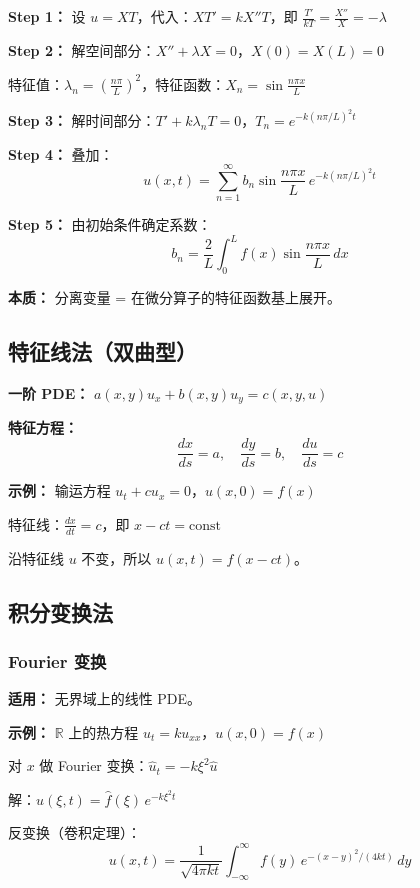 \textbf{Step 1：} 设 $u = XT$，代入：$XT' = kX''T$，即 $\frac{T'}{kT} = \frac{X''}{X} = -\lambda$

\textbf{Step 2：} 解空间部分：$X'' + \lambda X = 0$，$X(0) = X(L) = 0$

特征值：$\lambda_n = \left(\frac{n\pi}{L}\right)^2$，特征函数：$X_n = \sin\frac{n\pi x}{L}$

\textbf{Step 3：} 解时间部分：$T' + k\lambda_n T = 0$，$T_n = e^{-k(n\pi/L)^2 t}$

\textbf{Step 4：} 叠加：
\[
u(x,t) = \sum_{n=1}^{\infty} b_n \sin\frac{n\pi x}{L}\, e^{-k(n\pi/L)^2 t}
\]

\textbf{Step 5：} 由初始条件确定系数：
\[
b_n = \frac{2}{L}\int_0^L f(x)\sin\frac{n\pi x}{L}\,dx
\]

\textbf{本质：} 分离变量 = 在微分算子的特征函数基上展开。

\subsection{特征线法（双曲型）}

\textbf{一阶 PDE：} $a(x,y)u_x + b(x,y)u_y = c(x,y,u)$

\textbf{特征方程：}
\[
\frac{dx}{ds} = a, \quad \frac{dy}{ds} = b, \quad \frac{du}{ds} = c
\]

\textbf{示例：} 输运方程 $u_t + cu_x = 0$，$u(x,0) = f(x)$

特征线：$\frac{dx}{dt} = c$，即 $x - ct = \text{const}$

沿特征线 $u$ 不变，所以 $u(x,t) = f(x - ct)$。

\subsection{积分变换法}

\subsubsection{Fourier 变换}

\textbf{适用：} 无界域上的线性 PDE。

\textbf{示例：} $\mathbb{R}$ 上的热方程 $u_t = ku_{xx}$，$u(x,0) = f(x)$

对 $x$ 做 Fourier 变换：$\hat{u}_t = -k\xi^2 \hat{u}$

解：$\hat{u}(\xi, t) = \hat{f}(\xi)\, e^{-k\xi^2 t}$

反变换（卷积定理）：
\[
u(x,t) = \frac{1}{\sqrt{4\pi kt}}\int_{-\infty}^{\infty} f(y)\, e^{-(x-y)^2/(4kt)}\,dy
\]

